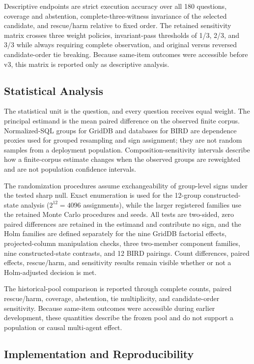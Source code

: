 \documentclass[applsci,article,submit,moreauthors]{Definitions/mdpi}
\begin{document}
Descriptive endpoints are strict execution accuracy over all 180 questions, coverage and abstention, complete-three-witness invariance of the selected candidate, and rescue/harm relative to fixed order. The retained sensitivity matrix crosses three weight policies, invariant-pass thresholds of 1/3, 2/3, and 3/3 while always requiring complete observation, and original versus reversed candidate-order tie breaking. Because same-item outcomes were accessible before v3, this matrix is reported only as descriptive analysis.

\subsection{Statistical Analysis}

The statistical unit is the question, and every question receives equal weight. The principal estimand is the mean paired difference on the observed finite corpus. Normalized-SQL groups for GridDB and databases for BIRD are dependence proxies used for grouped resampling and sign assignment; they are not random samples from a deployment population. Composition-sensitivity intervals describe how a finite-corpus estimate changes when the observed groups are reweighted and are not population confidence intervals.

The randomization procedures assume exchangeability of group-level signs under the tested sharp null. Exact enumeration is used for the 12-group constructed-state analysis ($2^{12}=4096$ assignments), while the larger registered families use the retained Monte Carlo procedures and seeds. All tests are two-sided, zero paired differences are retained in the estimand and contribute no sign, and the Holm families are defined separately for the nine GridDB factorial effects, projected-column manipulation checks, three two-member component families, nine constructed-state contrasts, and 12 BIRD pairings. Count differences, paired effects, rescue/harm, and sensitivity results remain visible whether or not a Holm-adjusted decision is met.

The historical-pool comparison is reported through complete counts, paired rescue/harm, coverage, abstention, tie multiplicity, and candidate-order sensitivity. Because same-item outcomes were accessible during earlier development, these quantities describe the frozen pool and do not support a population or causal multi-agent effect.

\subsection{Implementation and Reproducibility}
\end{document}

